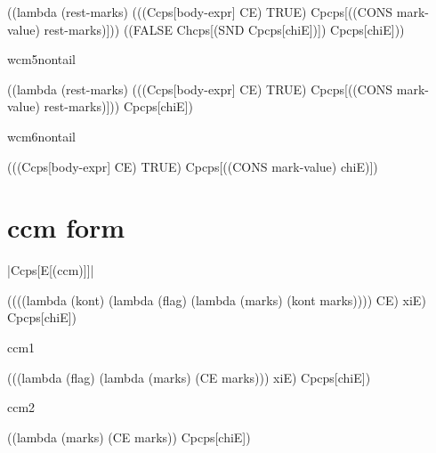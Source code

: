 \begin{schemeblock}
\begin{schemedisplay}
((lambda (rest-marks) 
   (((Ccps[body-expr] CE) TRUE) Cpcps[((CONS mark-value) rest-marks)]))
 ((FALSE Chcps[(SND Cpcps[chiE])]) Cpcps[chiE]))
\end{schemedisplay}
\end{schemeblock}

\noindent
wcm5nontail

\begin{schemeblock}
\begin{schemedisplay}
((lambda (rest-marks) 
   (((Ccps[body-expr] CE) TRUE) Cpcps[((CONS mark-value) rest-marks)]))
 Cpcps[chiE])
\end{schemedisplay}
\end{schemeblock}

\noindent
wcm6nontail

\begin{schemeblock}
\begin{schemedisplay}
(((Ccps[body-expr] CE) TRUE) Cpcps[((CONS mark-value) chiE)])
\end{schemedisplay}
\end{schemeblock}

\section{ccm form}

\noindent
\scheme|Ccps[E[(ccm)]]|
\begin{schemeblock}
\begin{schemedisplay}
((((lambda (kont)
     (lambda (flag)
       (lambda (marks)
         (kont marks))))
   CE) xiE) Cpcps[chiE])
\end{schemedisplay}
\end{schemeblock}

\noindent
ccm1

\begin{schemeblock}
\begin{schemedisplay}
(((lambda (flag)
    (lambda (marks)
      (CE marks)))
  xiE) Cpcps[chiE])
\end{schemedisplay}
\end{schemeblock}

\noindent
ccm2

\begin{schemeblock}
\begin{schemedisplay}
((lambda (marks)
   (CE marks))
 Cpcps[chiE])
\end{schemedisplay}
\end{schemeblock}

